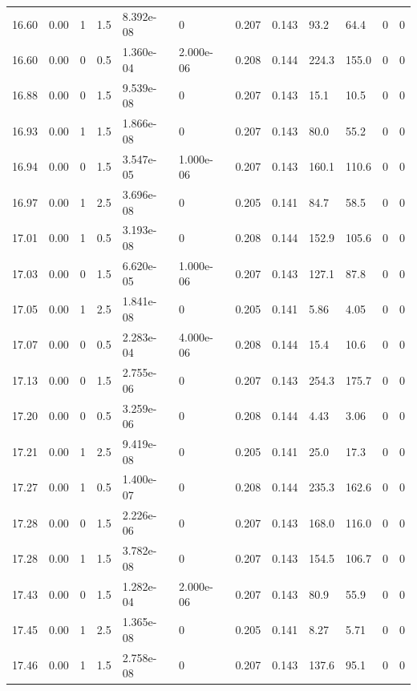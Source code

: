 \documentclass[preview]{standalone}
\begin{document}
{{{{{\begin{tabular}{L{1.2cm}C{1.2cm} C{0.3cm}C{0.5cm} C{1.4cm}C{1.4cm} C{1.4cm}C{1.4cm} C{1.6cm}C{1.6cm} C{1.6cm}C{1.6cm}}
  16.60  &  0.00  & 1     & 1.5 &  8.392e-08  & 0  &  0.207&   0.143& 93.2 & 64.4   &  0 & 0  \\ 
  16.60  &  0.00  & 0     & 0.5 &  1.360e-04  & 2.000e-06  &  0.208&   0.144& 224.3 & 155.0   &  0 & 0  \\ 
  16.88  &  0.00  & 0     & 1.5 &  9.539e-08  & 0  &  0.207&   0.143& 15.1 & 10.5   &  0 & 0  \\ 
  16.93  &  0.00  & 1     & 1.5 &  1.866e-08  & 0  &  0.207&   0.143& 80.0 & 55.2   &  0 & 0  \\ 
  16.94  &  0.00  & 0     & 1.5 &  3.547e-05  & 1.000e-06  &  0.207&   0.143& 160.1 & 110.6   &  0 & 0  \\ 
  16.97  &  0.00  & 1     & 2.5 &  3.696e-08  & 0  &  0.205&   0.141& 84.7 & 58.5   &  0 & 0  \\ 
  17.01  &  0.00  & 1     & 0.5 &  3.193e-08  & 0  &  0.208&   0.144& 152.9 & 105.6   &  0 & 0  \\ 
  17.03  &  0.00  & 0     & 1.5 &  6.620e-05  & 1.000e-06  &  0.207&   0.143& 127.1 & 87.8   &  0 & 0  \\ 
  17.05  &  0.00  & 1     & 2.5 &  1.841e-08  & 0  &  0.205&   0.141& 5.86 & 4.05   &  0 & 0  \\ 
  17.07  &  0.00  & 0     & 0.5 &  2.283e-04  & 4.000e-06  &  0.208&   0.144& 15.4 & 10.6   &  0 & 0  \\ 
  17.13  &  0.00  & 0     & 1.5 &  2.755e-06  & 0  &  0.207&   0.143& 254.3 & 175.7   &  0 & 0  \\ 
  17.20  &  0.00  & 0     & 0.5 &  3.259e-06  & 0  &  0.208&   0.144& 4.43 & 3.06   &  0 & 0  \\ 
  17.21  &  0.00  & 1     & 2.5 &  9.419e-08  & 0  &  0.205&   0.141& 25.0 & 17.3   &  0 & 0  \\ 
  17.27  &  0.00  & 1     & 0.5 &  1.400e-07  & 0  &  0.208&   0.144& 235.3 & 162.6   &  0 & 0  \\ 
  17.28  &  0.00  & 0     & 1.5 &  2.226e-06  & 0  &  0.207&   0.143& 168.0 & 116.0   &  0 & 0  \\ 
  17.28  &  0.00  & 1     & 1.5 &  3.782e-08  & 0  &  0.207&   0.143& 154.5 & 106.7   &  0 & 0  \\ 
  17.43  &  0.00  & 0     & 1.5 &  1.282e-04  & 2.000e-06  &  0.207&   0.143& 80.9 & 55.9   &  0 & 0  \\ 
  17.45  &  0.00  & 1     & 2.5 &  1.365e-08  & 0  &  0.205&   0.141& 8.27 & 5.71   &  0 & 0  \\ 
  17.46  &  0.00  & 1     & 1.5 &  2.758e-08  & 0  &  0.207&   0.143& 137.6 & 95.1   &  0 & 0  \\ 

\end{tabular}}}}}}
\end{document}
